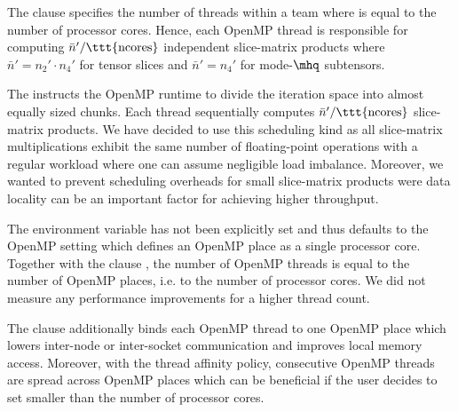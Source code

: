 The  clause specifies the number of threads within a team where  is equal to the number of processor cores. 
Hence, each OpenMP thread is responsible for computing $\bar{n}' / \text{\ttt{ncores}}$ independent slice-matrix products where $\bar{n}' = n_2' \cdot n_4'$ for tensor slices and $\bar{n}' = n_4'$ for mode-$\mhq$ subtensors.

The  instructs the OpenMP runtime to divide the iteration space into almost equally sized chunks.
Each thread sequentially computes $ \bar{n}' / \text{\ttt{ncores}}$ slice-matrix products.
We have decided to use this scheduling kind as all slice-matrix multiplications exhibit the same number of floating-point operations with a regular workload where one can assume negligible load imbalance.
Moreover, we wanted to prevent scheduling overheads for small slice-matrix products were data locality can be an important factor for achieving higher throughput.

The  environment variable has not been explicitly set and thus defaults to the OpenMP  setting which defines an OpenMP place as a single processor core. %
Together with the clause , the number of OpenMP threads is equal to the number of OpenMP places, i.e. to the number of processor cores.
We did not measure any performance improvements for a higher thread count.

The  clause additionally binds each OpenMP thread to one OpenMP place which lowers inter-node or inter-socket communication and improves local memory access.
Moreover, with the  thread affinity policy, consecutive OpenMP threads are spread across OpenMP places which can be beneficial if the user decides to set  smaller than the number of processor cores.

 

